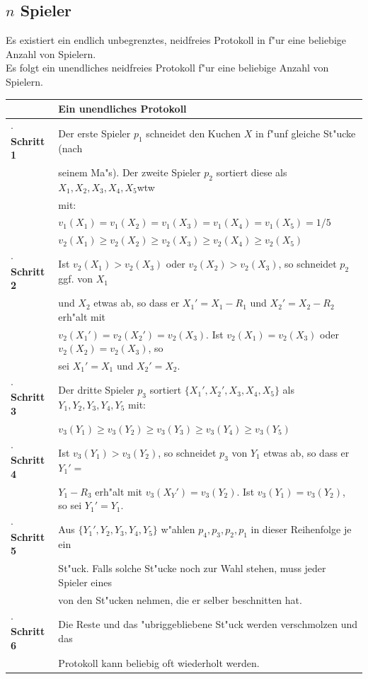 \documentclass[11pt, a4paper, twoside]{article}
\newcommand{\wf}{\color{white}}
\newcommand{\tf}{\color{black}}
\numberwithin{equation}{section}
\begin{document}
\subsection{$n$ Spieler}
Es existiert ein endlich unbegrenztes, neidfreies Protokoll in \cite{5} f"ur eine beliebige Anzahl von Spielern.\\
Es folgt ein unendliches neidfreies Protokoll f"ur eine beliebige Anzahl von Spielern.\\
\newline
\begin{tabular}{|ll|}
\hline
&\textbf{Ein unendliches Protokoll}\\
\hline
\textbf{$\cdot$ Schritt 1}&Der erste Spieler $p_1$ schneidet den Kuchen $X$ in f"unf gleiche St"ucke (nach\\&seinem Ma"s). Der zweite Spieler $p_2$ sortiert diese als $X_1,X_2,X_3,X_4,X_5$\wf wtw\tf\\& mit:\\
&$v_1(X_1)=v_1(X_2)=v_1(X_3)=v_1(X_4)=v_1(X_5)=1/5$\\&$v_2(X_1) \geq v_2(X_2) \geq v_2(X_3)\geq v_2(X_4)\geq v_2(X_5)$\\
\textbf{$\cdot$ Schritt 2}&Ist $v_2(X_1)>v_2(X_3)$ oder $v_2(X_2)> v_2(X_3)$, so schneidet $p_2$ ggf. von $X_1$\\&und $X_2$ etwas ab, so dass er $X_1'=X_1-R_1$ und $X_2'=X_2-R_2$ erh"alt mit   \\&$v_2(X_1')=v_2(X_2')=v_2(X_3)$. Ist $v_2(X_1)=v_2(X_3)$ oder $v_2(X_2)=v_2(X_3)$, so\\&sei $X_1'=X_1$ und $X_2'=X_2$.\\
\textbf{$\cdot$ Schritt 3}&Der dritte Spieler $p_3$ sortiert $\{X_1',X_2',X_3,X_4,X_5\}$ als $Y_1,Y_2,Y_3,Y_4,Y_5$ mit:\\
&$v_3(Y_1) \geq v_3(Y_2) \geq v_3(Y_3)\geq v_3(Y_4)\geq v_3(Y_5)$\\
\textbf{$\cdot$ Schritt 4}&Ist $v_3(Y_1)>v_3(Y_2)$, so schneidet $p_3$ von $Y_1$ etwas ab, so dass er $Y_1'=$\\&$Y_1-R_3$ erh"alt mit $v_3(X_Y')=v_3(Y_2)$. Ist $v_3(Y_1)=v_3(Y_2)$, so sei  $Y_1'=Y_1$.\\
\textbf{$\cdot$ Schritt 5}&Aus $\{Y_1',Y_2,Y_3,Y_4,Y_5\}$ w"ahlen $p_4,p_3,p_2,p_1$ in dieser Reihenfolge je ein\\&St"uck. Falls solche St"ucke noch zur Wahl stehen, muss jeder Spieler eines\\&von den St"ucken nehmen, die er selber beschnitten hat.\\
\textbf{$\cdot$ Schritt 6}&Die Reste und das "ubriggebliebene St"uck werden verschmolzen und das\\&Protokoll kann beliebig oft wiederholt werden.\\
\hline
\end{tabular}
\end{document}
